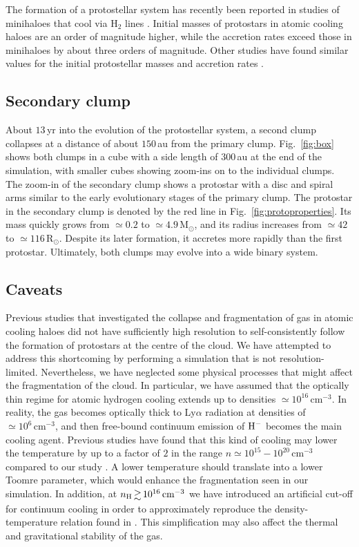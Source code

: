 \documentclass[useAMS,usenatbib]{mnras}
\newcommand{\cmmm}{\text{cm}^{-3}}
\newcommand{\HH}{\text{H}_2}          %
\newcommand{\HM}{{\rm H}^{-}}     %
\newcommand{\nh}{n_{\rm H}}
\newcommand{\msun}{\text{M}_\odot}
\newcommand{\rsun}{\text{R}_\odot}
\begin{document}
The formation of a protostellar system has recently been reported in studies of minihaloes that cool via $\HH$ lines \citep{Clark_2008, Clark_2011, Greif_2011}. Initial masses of protostars in atomic cooling haloes are an order of magnitude higher, while the accretion rates exceed those in minihaloes by about three orders of magnitude. Other studies have found similar values for the initial protostellar masses and accretion rates \citep{Regan_2009, Latif_2013a, Regan_2014a, Inayoshi_2014}.
        
\subsection{Secondary clump}
\label{subsec:secondary}

About $13\,$yr into the evolution of the protostellar system, a second clump collapses at a distance of about $150\,$au from the primary clump. Fig.~\ref{fig:box} shows both clumps in a cube with a side length of $300\,$au at the end of the simulation, with smaller cubes showing zoom-ins on to the individual clumps. The zoom-in of the secondary clump shows a protostar with a disc and spiral arms similar to the early evolutionary stages of the primary clump. The protostar in the secondary clump is denoted by the red line in Fig.~\ref{fig:protoproperties}. Its mass quickly grows from $\simeq 0.2$ to $\simeq 4.9\,\msun$, and its radius increases from $\simeq 42$ to $\simeq 116\,\rsun$. Despite its later formation, it accretes more rapidly than the first protostar. Ultimately, both clumps may evolve into a wide binary system.

\subsection{Caveats}
\label{subsec:caveats}

Previous studies that investigated the collapse and fragmentation of gas in atomic cooling haloes did not have sufficiently high resolution to self-consistently follow the formation of protostars at the centre of the cloud. We have attempted to address this shortcoming by performing a simulation that is not resolution-limited. Nevertheless, we have neglected some physical processes that might affect the fragmentation of the cloud. In particular, we have assumed that the optically thin regime for atomic hydrogen cooling extends up to densities $\simeq 10^{16}\,\cmmm$. In reality, the gas becomes optically thick to Ly$\alpha$ radiation at densities of $\simeq 10^6\,\cmmm$, and then free-bound continuum emission of $\HM$ becomes the main cooling agent. Previous studies have found that this kind of cooling may lower the temperature by up to a factor of $2$ in the range $n \simeq 10^{15} - 10^{20}\,\cmmm$ compared to our study \citep{Omukai_2001, Inayoshi_2014}. A lower temperature should translate into a lower Toomre parameter, which would enhance the fragmentation seen in our simulation. In addition, at $\nh \ga 10^{16}\,\cmmm$ we have introduced an artificial cut-off for continuum cooling in order to approximately reproduce the density-temperature relation found in \citet{Omukai_2001}. This simplification may also affect the thermal and gravitational stability of the gas.
\end{document}
